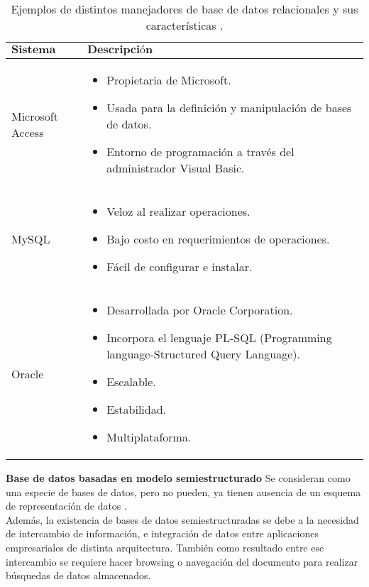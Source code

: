 \begin{table}[H]
	\centering 
	\caption{Ejemplos de distintos manejadores de base de datos
		relacionales y sus características 
		\cite{db:gestores:tics}.}
	\begin{tabular*}{0.9\textwidth}{@{\extracolsep{\fill}} |l|l|}
		\hline
		$\textbf{Sistema gestor}$ & $\textbf{Descripción}$
		\\\hline \hline
		\parbox[t]{3cm}{Microsoft Access} & 
		\parbox[t]{10.2cm}{
		\begin{itemize}
		\item Propietaria de Microsoft.
		\item Usada para la definición y manipulación de bases de datos.
		\item Entorno de programación a través del administrador Visual 
			Basic.
		\end{itemize}
		} 
		\\\hline
		\parbox[t]{3cm}{MySQL} & \parbox[t]{10.2cm}{
		\begin{itemize}		
		\item Veloz al realizar operaciones. 
		\item Bajo costo en requerimientos de operaciones.
		\item Fácil de configurar e instalar.
		\end{itemize}
		} 
		\\\hline
		\parbox[t]{3cm}{Oracle} & \parbox[t]{10.2cm}{
		\begin{itemize}
		\item Desarrollada por Oracle Corporation. 
		\item Incorpora el lenguaje PL-SQL (Programming 
			language-Structured Query Language).
		\item Escalable.
		\item Estabilidad.
		\item Multiplataforma.
		\end{itemize}
		} 
		\\\hline
	\end{tabular*}
\end{table}

%
\textbf{Base de datos basadas en modelo semiestructurado}
\label{sub:bdRelacionales}
Se consideran como una especie de bases de datos, pero no pueden, ya tienen 
ausencia de un esquema de representación de datos \cite{db:ciencias:computacion}. \\
Además, la existencia de bases de datos semiestructuradas se debe a la necesidad 
de intercambio de información, e integración de datos entre aplicaciones 
empresariales de distinta arquitectura. También como resultado entre ese 
intercambio se requiere hacer browsing o navegación del documento para realizar 
búsquedas de datos almacenados. \\

